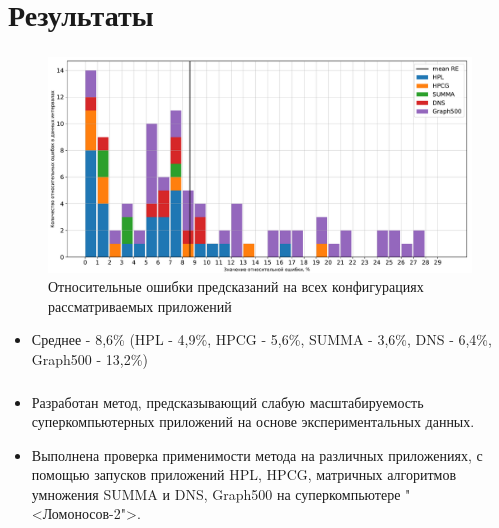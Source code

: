 \documentclass[unicode, t, 11pt]{beamer}%
\begin{document}
	\section{Результаты}
		\begin{frame}
			\frametitle{\insertsection}
			\footnotesize
			\begin{figure}
				\captionsetup{font=tiny, labelfont=tiny}
				\centering
				\includegraphics[width=\textwidth]{./images/RE_graph}
				\caption{Относительные ошибки предсказаний на всех конфигурациях рассматриваемых приложений}
			\end{figure}
			
			\begin{itemize}[label = \(\bullet\)]
			\item Среднее - 8,6\% (HPL - 4,9\%, HPCG - 5,6\%, SUMMA - 3,6\%, DNS - 6,4\%, Graph500 - 13,2\%)

			\end{itemize}
		\end{frame}
		\begin{frame}
			\frametitle{\insertsection}
			\begin{itemize}[label = \(\bullet\)]
			\item Разработан метод, предсказывающий слабую масштабируемость суперкомпьютерных приложений на основе экспериментальных данных.
			\item Выполнена проверка применимости метода на различных приложениях, с помощью запусков приложений HPL, HPCG, матричных алгоритмов умножения SUMMA и DNS, Graph500 на суперкомпьютере "<Ломоносов-2">.
			\end{itemize}
		\end{frame}
\end{document}
